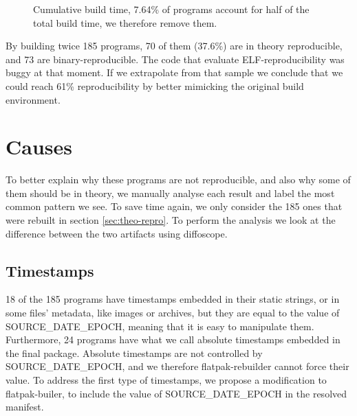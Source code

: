 \documentclass[a4paper,11pt,oneside]{report}
\theoremstyle{definition}
\newcommand{\sysname}{flatpak-rebuilder\xspace}
\newcommand{\fb}{flatpak-builer\xspace}
\newcommand{\sde}{SOURCE\_DATE\_EPOCH\xspace}
\newcommand{\dfc}{diffoscope\xspace}
\begin{document}
\begin{figure}[h]
    \caption{Cumulative build time, 7.64\% of programs
    account for half of the total build time, we therefore remove them.}
    \label{fig:buildtime}
\end{figure}

By building twice 185 programs, 70 of them (37.6\%) are in theory reproducible,
and 73 are binary-reproducible. The code that evaluate ELF-reproducibility was
buggy at that moment. If we extrapolate from that sample we conclude that we
could reach 61\% reproducibility by better mimicking the original build
environment.

\section{Causes}
To better explain why these programs are not reproducible, and also why some of
them should be in theory, we manually analyse each result and label the most
common pattern we see. To save time again, we only consider the 185 ones that
were rebuilt in section \autoref{sec:theo-repro}. To perform the analysis we
look at the difference between the two artifacts using \dfc.

\subsection*{Timestamps}
18 of the 185 programs have timestamps embedded in their static strings, or in
some files' metadata, like images or archives, but they are equal to the value
of \sde, meaning that it is easy to manipulate them. Furthermore, 24 programs
have what we call absolute timestamps embedded in the final package. Absolute
timestamps are not controlled by \sde, and we therefore \sysname cannot force
their value. To address the first type of timestamps, we propose a modification
to \fb, to include the value of \sde in the resolved manifest.
\end{document}
